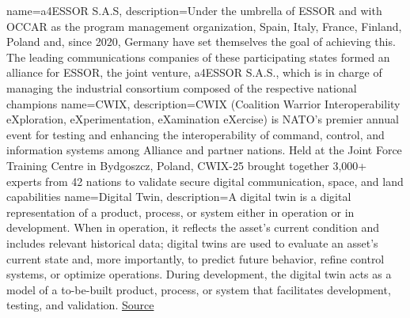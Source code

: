 %
%
{%
	name=a4ESSOR S.A.S,%
	description={Under the umbrella of ESSOR and with OCCAR as the program management organization, %
	Spain, Italy, France, Finland, Poland and, since 2020, Germany have set themselves the goal of achieving this. %
	The leading communications companies of these participating states formed an alliance for ESSOR, %
	the joint venture, a4ESSOR S.A.S., which is in charge of managing the industrial consortium composed of the respective national champions}%
}
%
{%
	name=CWIX,%
	description={CWIX (Coalition Warrior Interoperability eXploration, eXperimentation, eXamination eXercise) is NATO's premier annual event 
		for testing and enhancing the interoperability of command, control, and information systems among Alliance and partner nations.
		Held at the Joint Force Training Centre in Bydgoszcz, Poland, CWIX-25 brought together 3,000+ experts from 42 nations
		to validate secure digital communication, space, and land capabilities}%
}
%
{%
	name=Digital Twin,%
	description={A digital twin is a digital representation of a product, process, or system either in operation or in development.
	    When in operation, it reflects the asset’s current condition and includes relevant historical data;
		digital twins are used to evaluate an asset’s current state and, more importantly, to predict future behavior, refine control systems, or optimize operations.
		During development, the digital twin acts as a model of a to-be-built product, process, or system that facilitates development, testing, and validation.
		\href{https://www.mathworks.com/discovery/digital-twin.html}{Source}}%
}
%
